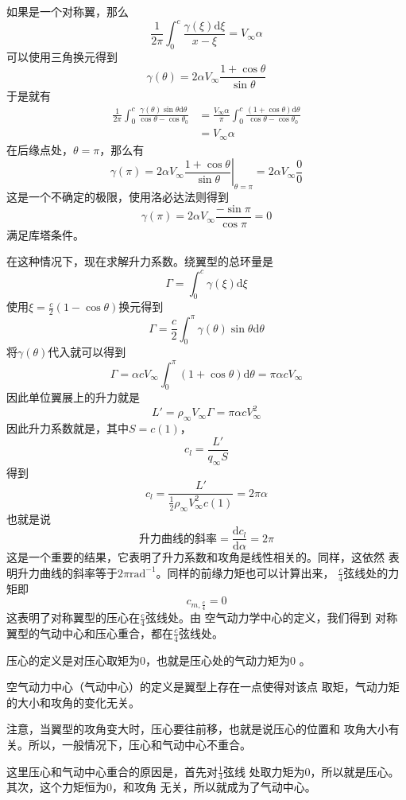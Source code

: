 如果是一个对称翼，那么
\[
  \frac{1}{2\pi}\int _0^c \frac{\gamma(\xi)\mathrm{d}\xi}{x-\xi}=V_\infty \alpha
\]
可以使用三角换元得到
\[
  \gamma(\theta)=2\alpha V_\infty \frac{1+\cos \theta}{\sin \theta}
\]
于是就有
\[
  \begin{split}
    \frac{1}{2\pi}\int _0^c \frac{\gamma(\theta)\sin  \theta \mathrm{d}\theta}{\cos \theta -\cos \theta_0}
    &=\frac{V_\infty \alpha}{\pi}\int _0^c \frac{(1+\cos \theta)\mathrm{d}\theta}{\cos \theta -\cos \theta_0}\\ 
    &=V_\infty \alpha
  \end{split}
\]
在后缘点处，$\theta=\pi$，那么有
\[
  \gamma(\pi)=2\alpha V_\infty \left.\frac{1+\cos \theta}{\sin \theta}\right| _{\theta=\pi}=
    2\alpha V_\infty \frac{0}{0}
\]
这是一个不确定的极限，使用洛必达法则得到
\[
  \gamma(\pi)=2\alpha V_\infty \frac{-\sin \pi}{\cos \pi}=0 
\]
满足库塔条件。

在这种情况下，现在求解升力系数。绕翼型的总环量是
\[
  \Gamma=\int _0 ^c \gamma(\xi)\mathrm{d}\xi 
\]
使用$\xi=\frac{c}{2 }(1-\cos \theta)$换元得到
\[
  \Gamma=\frac{c}{2}\int _0^\pi \gamma(\theta)\sin \theta \mathrm{d} \theta
\]
将$\gamma(\theta)$代入就可以得到
\[
  \Gamma=\alpha c V_\infty \int_0^\pi (1+\cos \theta)\mathrm{d}\theta =\pi \alpha c V_\infty 
\]
因此单位翼展上的升力就是
\[
  L'=\rho _\infty V_\infty \Gamma =\pi \alpha c V_\infty^2 
\]
因此升力系数就是，其中$S=c(1)$，
\[
  c_l=\frac{L'}{q_\infty S}
\]
得到
\[
  c_l=\frac{L'}{\frac{1}{2}\rho_\infty V_\infty^2 c(1)}=2\pi \alpha
\]
也就是说
\[
  升力曲线的斜率=\frac{\mathrm{d}c_l}{\mathrm{d}\alpha}=2\pi
\]
这是一个重要的结果，它表明了升力系数和攻角是线性相关的。同样，这依然
表明升力曲线的斜率等于$2\pi \mathrm{rad}^{-1}$。同样的前缘力矩也可以计算出来，
$\frac{c}{4}$弦线处的力矩即
\[
  c_{m,\frac{c}{4}}=0
\]
这表明了{\color{noteorange}对称翼型的压心在$\frac{c}{4}$弦线处}。由
空气动力学中心的定义，我们得到
{\color{noteorange}对称翼型的气动中心和压心重合，都在$\frac{c}{4}$弦线处}。
\begin{notice}
压心的定义是对压心取矩为0，也就是压心处的气动力矩为0 。

空气动力中心（气动中心）的定义是翼型上存在一点使得对该点
取矩，气动力矩的大小和攻角的变化无关。

注意，当翼型的攻角变大时，压心要往前移，也就是说压心的位置和
攻角大小有关。所以，一般情况下，压心和气动中心不重合。

这里压心和气动中心重合的原因是，首先对$\frac{1}{4 }$弦线
处取力矩为0，所以就是压心。其次，这个力矩恒为0，和攻角
无关，所以就成为了气动中心。
\end{notice}


